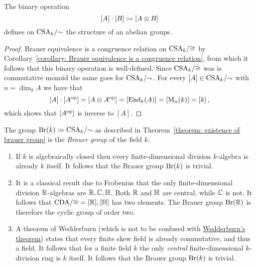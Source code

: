 \begin{theorem}
  \label{theorem: existence of brauer group}
  The binary operation
  \[
              [A] \cdot [B]
    \coloneqq  [A \otimes B]
  \]
  defines on $\operatorname{CSA}_k\!/{\sim}$ the structure of an abelian groups.
\end{theorem}


\begin{proof}
  Brauer equivalence is a congruence relation on $\operatorname{CSA}_k\!/{\cong}$ by Corollary~\ref{corollary: Brauer equivalence is a congruence relation}, from which it follows that this binary operation is well-defined.
  Since $\operatorname{CSA}_k\!/{\cong}$ was is commutative monoid the same goes for $\operatorname{CSA}_k\!/{\sim}$.
  For every $[A] \in \operatorname{CSA}_k\!/{\sim}$ with $n = \dim_k A$ we have that
  \[
      [A] \cdot [A^{\mathrm{op}}]
    = [A \otimes A^{\mathrm{op}}]
    = [\operatorname{End}_k(A)]
    = [\operatorname{M}_n(k)]
    = [k] \,,
  \]
  which shows that $[A^{\mathrm{op}}]$ is inverse to $[A]$.
\end{proof}


\begin{definition}
  The group $\operatorname{Br}(k) \coloneqq \operatorname{CSA}_k\!/{\sim}$ as described in Theorem~\ref{theorem: existence of brauer group} is the \emph{Brauer group} of the field $k$.
\end{definition}


\begin{example}
  \leavevmode
  \begin{enumerate}
    \item
      If $k$ is algebraically closed then every finite-dimensional division $k$-algebra is already $k$ itself.
      It follows that the Brauer group $\operatorname{Br}(k)$ is trivial.
    \item
      It is a classical result due to Frobenius that the only finite-dimensional division $\mathbb{R}$-algebras are $\mathbb{R}, \mathbb{C}, \mathbb{H}$.
      Both $\mathbb{R}$ and $\mathbb{H}$ are central, while $\mathbb{C}$ is not.
      It follows that $\operatorname{CDA}\!/{\cong} = {[\mathbb{R}], [\mathbb{H}]}$ has two elements.
      The Brauer group $\operatorname{Br}(\mathbb{R})$ is therefore the cyclic group of order two.
    \item
      A theorem of Wedderburn (which is not to be confused with \hyperref[theorem: wedderburns theorem]{Wedderburn’s theorem}) states that every finite skew field is already commutative, and thus a field.
      It follows that for a finite field $k$ the only \emph{central} finite-dimensional $k$-division ring is $k$ itself.
      It follows that the Brauer group $\operatorname{Br}(k)$ is trivial.
  \end{enumerate}
\end{example}






